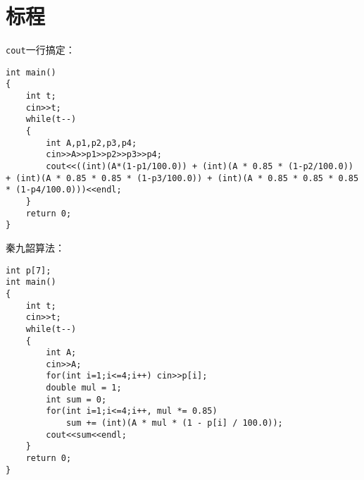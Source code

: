 \documentclass[
    lang=cn,
    color=blue
]{elegantbook}
\begin{document}
\section*{标程}
\lstinline{cout}一行搞定：
\begin{lstlisting}
int main()
{
    int t;
    cin>>t;
    while(t--)
    {
        int A,p1,p2,p3,p4;
        cin>>A>>p1>>p2>>p3>>p4;
        cout<<((int)(A*(1-p1/100.0)) + (int)(A * 0.85 * (1-p2/100.0)) + (int)(A * 0.85 * 0.85 * (1-p3/100.0)) + (int)(A * 0.85 * 0.85 * 0.85 * (1-p4/100.0)))<<endl;
    }
    return 0;
}
\end{lstlisting}

秦九韶算法：
\begin{lstlisting}
int p[7];
int main()
{
    int t;
    cin>>t;
    while(t--)
    {
        int A;
        cin>>A;
        for(int i=1;i<=4;i++) cin>>p[i];
        double mul = 1;
        int sum = 0;
        for(int i=1;i<=4;i++, mul *= 0.85)
            sum += (int)(A * mul * (1 - p[i] / 100.0));
        cout<<sum<<endl;
    }
    return 0;
}
\end{lstlisting}
\end{document}
